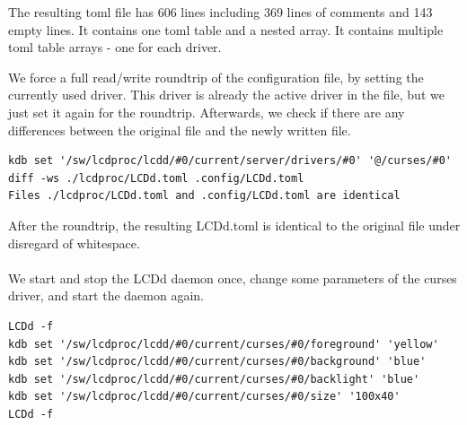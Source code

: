 \documentclass[draft,final]{vutinfth} %
\begin{document}
The resulting \acrshort{toml} file has 606 lines including 369 lines of comments and 143 empty lines.
It contains one \acrshort{toml} table and a nested array.
It contains multiple \acrshort{toml} table arrays - one for each driver.

We force a full read/write roundtrip of the configuration file, by setting the currently used driver. This driver is already the active driver in the file, but we just set it again for the roundtrip.
Afterwards, we check if there are any differences between the original file and the newly written file.

\begin{Verbatim}[frame=single, fontsize=\small]
kdb set '/sw/lcdproc/lcdd/#0/current/server/drivers/#0' '@/curses/#0'
diff -ws ./lcdproc/LCDd.toml .config/LCDd.toml
Files ./lcdproc/LCDd.toml and .config/LCDd.toml are identical
\end{Verbatim}

After the roundtrip, the resulting LCDd.toml is identical to the original file under disregard of whitespace.
\\\\
We start and stop the LCDd daemon once, change some parameters of the curses driver, and start the daemon again.
\begin{Verbatim}[frame=single, fontsize=\small]
LCDd -f
kdb set '/sw/lcdproc/lcdd/#0/current/curses/#0/foreground' 'yellow'
kdb set '/sw/lcdproc/lcdd/#0/current/curses/#0/background' 'blue'
kdb set '/sw/lcdproc/lcdd/#0/current/curses/#0/backlight' 'blue'
kdb set '/sw/lcdproc/lcdd/#0/current/curses/#0/size' '100x40'
LCDd -f
\end{Verbatim}
\end{document}
